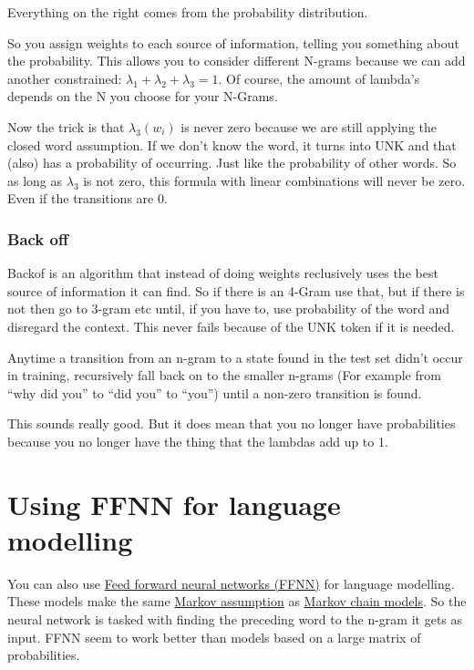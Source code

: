 \documentclass[
  11pt,
  british,
]{article}
\begin{document}
Everything on the right comes from the probability distribution.

So you assign weights to each source of information, telling you
something about the probability. This allows you to consider different
N-grams because we can add another constrained:
\(\lambda_{1}+ \lambda_{2} + \lambda_{3} = 1\). Of course, the amount of
lambda's depends on the N you choose for your N-Grams.

Now the trick is that \(\lambda_3(w_i)\) is never zero because we are
still applying the closed word assumption. If we don't know the word, it
turns into \textbar UNK\textbar{} and that (also) has a probability of
occurring. Just like the probability of other words. So as long as
\(\lambda_3\) is not zero, this formula with linear combinations will
never be zero. Even if the transitions are 0.

\hypertarget{back-off}{%
\subsubsection{Back off}\label{back-off}}

Backof is an algorithm that instead of doing weights reclusively uses
the best source of information it can find. So if there is an 4-Gram use
that, but if there is not then go to 3-gram etc until, if you have to,
use probability of the word and disregard the context. This never fails
because of the \textbar UNK\textbar{} token if it is needed.

Anytime a transition from an n-gram to a state found in the test set
didn't occur in training, recursively fall back on to the smaller
n-grams (For example from ``why did you'' to ``did you'' to ``you'')
until a non-zero transition is found.

This sounds really good. But it does mean that you no longer have
probabilities because you no longer have the thing that the lambdas add
up to 1.

\hypertarget{using-ffnn-for-language-modelling}{%
\section{Using FFNN for language
modelling}\label{using-ffnn-for-language-modelling}}

You can also use
\href{Feed\%20forward\%20neural\%20networks\%20(FFNN).md}{Feed forward
neural networks (FFNN)} for language modelling. These models make the
same \href{Markov\%20assumption.md}{Markov assumption} as
\href{Markov\%20models.md}{Markov chain models}. So the neural network
is tasked with finding the preceding word to the n-gram it gets as
input. FFNN seem to work better than models based on a large matrix of
probabilities.
\end{document}
